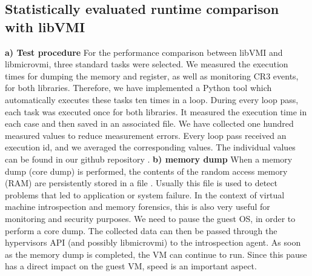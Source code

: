 \documentclass[sigconf]{acmart}
\begin{document}
\subsection{Statistically evaluated runtime comparison with libVMI}
\textbf{a) Test procedure }
\newline
For the performance comparison between libVMI and libmicrovmi, three standard tasks were selected. We measured the execution times for dumping the memory and register, as well as monitoring CR3 events, for both libraries.
\newline
\newline
Therefore, we have implemented a Python tool which automatically executes these tasks ten times in a loop. During every loop pass, each task was executed once for both libraries. It measured the execution time in each case and then saved in an associated file. We have collected one hundred measured values ​​to reduce measurement errors. Every loop pass received an execution id, and we averaged the corresponding values. The individual values ​​can be found in our github repository \cite{githubcsecpaper}.
\newline
\newline
\textbf{b) memory dump}
\newline
When a memory dump (core dump) is performed, the contents of the random access memory (RAM) are persistently stored in a file \cite{6885969}. Usually this file is used to detect problems that led to application or system failure. In the context of virtual machine introspection and memory forensics, this is also very useful for monitoring and security purposes. 
\newline
\newline
We need to pause the guest OS, in order to perform a core dump. The collected data can then be passed through the hypervisors API (and possibly libmicrovmi) to the introspection agent. As soon as the memory dump is completed, the VM can continue to run. Since this pause has a direct impact on the guest VM, speed is an important aspect. 
\end{document}
